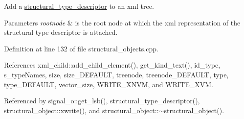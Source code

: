 Add a \hyperlink{structstructural__type__descriptor}{structural\+\_\+type\+\_\+descriptor} to an xml tree. 


\begin{DoxyParams}{Parameters}
{\em rootnode} & is the root node at which the xml representation of the structural type descriptor is attached. \\
\hline
\end{DoxyParams}


Definition at line 132 of file structural\+\_\+objects.\+cpp.



References xml\+\_\+child\+::add\+\_\+child\+\_\+element(), get\+\_\+kind\+\_\+text(), id\+\_\+type, s\+\_\+type\+Names, size, size\+\_\+\+D\+E\+F\+A\+U\+LT, treenode, treenode\+\_\+\+D\+E\+F\+A\+U\+LT, type, type\+\_\+\+D\+E\+F\+A\+U\+LT, vector\+\_\+size, W\+R\+I\+T\+E\+\_\+\+X\+N\+VM, and W\+R\+I\+T\+E\+\_\+\+X\+VM.



Referenced by signal\+\_\+o\+::get\+\_\+lsb(), structural\+\_\+type\+\_\+descriptor(), structural\+\_\+object\+::xwrite(), and structural\+\_\+object\+::$\sim$structural\+\_\+object().

